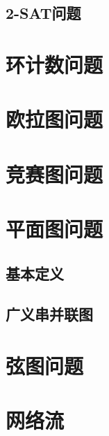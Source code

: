 \documentclass[12pt,a4paper]{article}
\begin{document}
\subsection{2-SAT问题}

\newpage
\section{环计数问题}

\newpage
\section{欧拉图问题}

\newpage
\section{竞赛图问题} %

\newpage
\section{平面图问题}
\subsection{基本定义}
\subsection{广义串并联图}

\newpage
\section{弦图问题} %

\newpage
\section{网络流}
\end{document}
